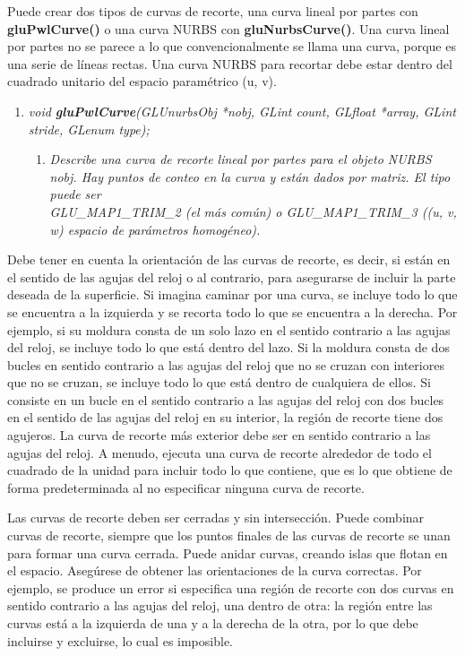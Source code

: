 Puede crear dos tipos de curvas de recorte, una curva lineal por partes con
\textbf{gluPwlCurve()} o una curva NURBS con \textbf{gluNurbsCurve()}.
Una curva lineal por partes no se parece a lo que convencionalmente
se llama una curva, porque es una serie de líneas rectas. Una curva
NURBS para recortar debe estar dentro del cuadrado unitario del espacio
paramétrico (u, v).

\begin{enumerate}
    \item \emph{void \textbf{gluPwlCurve}(GLUnurbsObj *nobj, GLint count, GLfloat *array,
    GLint stride, GLenum type);}
    \begin{enumerate}
        \item[] \textit{Describe una curva de recorte lineal por partes para
            el objeto NURBS nobj. Hay puntos de conteo en la curva y
            están dados por matriz. El tipo puede ser\\GLU\_MAP1\_TRIM\_2
            (el más común) o GLU\_MAP1\_TRIM\_3 ((u, v, w) espacio de
            parámetros homogéneo).
        }
    \end{enumerate}
\end{enumerate}

Debe tener en cuenta la orientación de las curvas de recorte, es decir,
si están en el sentido de las agujas del reloj o al contrario,
para asegurarse de incluir la parte deseada de la superficie.
Si imagina caminar por una curva, se incluye todo lo que se encuentra
a la izquierda y se recorta todo lo que se encuentra a la derecha.
Por ejemplo, si su moldura consta de un solo lazo en el sentido contrario
a las agujas del reloj, se incluye todo lo que está dentro del lazo.
Si la moldura consta de dos bucles en sentido contrario a las agujas del
reloj que no se cruzan con interiores que no se cruzan, se incluye todo
lo que está dentro de cualquiera de ellos. Si consiste en un bucle en el
sentido contrario a las agujas del reloj con dos bucles en el sentido
de las agujas del reloj en su interior, la región de recorte tiene dos
agujeros. La curva de recorte más exterior debe ser en sentido contrario
a las agujas del reloj. A menudo, ejecuta una curva de recorte alrededor
de todo el cuadrado de la unidad para incluir todo lo que contiene, que
es lo que obtiene de forma predeterminada al no especificar ninguna curva de recorte.

Las curvas de recorte deben ser cerradas y sin intersección. Puede combinar
curvas de recorte, siempre que los puntos finales de las curvas de recorte
se unan para formar una curva cerrada. Puede anidar curvas, creando islas
que flotan en el espacio. Asegúrese de obtener las orientaciones de la
curva correctas. Por ejemplo, se produce un error si especifica una región
de recorte con dos curvas en sentido contrario a las agujas del reloj,
una dentro de otra: la región entre las curvas está a la izquierda de una
y a la derecha de la otra, por lo que debe incluirse y excluirse, lo cual es imposible.


